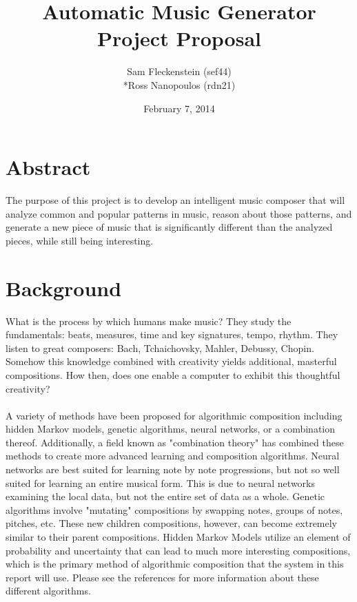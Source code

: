 \documentclass{article}
\begin{document}
\clearpage
{}
\begin{center}
\begin{minipage}{.6\textwidth}

\title{Automatic Music Generator \\ \vspace{2 pt} \Large{Project Proposal}}
\author{Sam Fleckenstein (sef44)\\*Ross Nanopoulos (rdn21)}
\date{February 7, 2014}
\maketitle

\end{minipage}
\end{center}
\clearpage

\tableofcontents
\newpage

\section{Abstract}
The purpose of this project is to develop an intelligent music composer that will analyze common and popular patterns in music, reason about those patterns, and generate a new piece of music that is significantly different than the analyzed pieces, while still being interesting.

\section{Background}
What is the process by which humans make music? They study the fundamentals: beats, measures, time and key signatures, tempo, rhythm. They listen to great composers: Bach, Tchaichovsky, Mahler, Debussy, Chopin. Somehow this knowledge combined with creativity yields additional, masterful compositions. How then, does one enable a computer to exhibit this thoughtful creativity?\\
\\
A variety of methods have been proposed for algorithmic composition including hidden Markov models, genetic algorithms, neural networks, or a combination thereof. Additionally, a field known as "combination theory" has combined these methods to create more advanced learning and composition algorithms. Neural networks are best suited for learning note by note progressions, but not so well suited for learning an entire musical form. This is due to neural networks examining the local data, but not the entire set of data as a whole. Genetic algorithms involve "mutating" compositions by swapping notes, groups of notes, pitches, etc. These new children compositions, however, can become extremely similar to their parent compositions. Hidden Markov Models utilize an element of probability and uncertainty that can lead to much more interesting compositions, which is the primary method of algorithmic composition that the system in this report will use. Please see the references for more information about these different algorithms.
\end{document}

